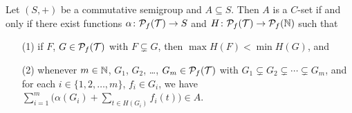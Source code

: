 \begin{thm}
  Let $(S, +)$ be a commutative semigroup and $A \subseteq S$.
  Then $A$ is a $C$-set if and only if there exist functions $\alpha \colon \mathcal{P}_f(\mathcal{T}) \to S$ and $H \colon \mathcal{P}_f(\mathcal{T}) \to \mathcal{P}_f(\mathbb{N})$ such that
  \begin{itemize}
    \item[(1)] if $F$, $G \in \mathcal{P}_f(\mathcal{T})$ with $F \subsetneq G$, then $\max H(F) < \min H(G)$, and
    
    \item[(2)] whenever $m \in \mathbb{N}$, $G_1$, $G_2$, \dots, $G_m \in \mathcal{P}_f(\mathcal{T})$ with $G_1 \subsetneq G_2 \subsetneq \cdots \subsetneq G_m$, and for each $i \in \{1, 2, \ldots, m\}$, $f_i \in G_i$, we have $\sum_{i=1}^m\bigl( \alpha(G_i) + \sum_{t \in H(G_i)} f_i(t)\bigr) \in A$.
  \end{itemize}
\end{thm}

